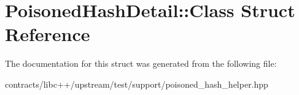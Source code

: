 \hypertarget{struct_poisoned_hash_detail_1_1_class}{}\section{Poisoned\+Hash\+Detail\+:\+:Class Struct Reference}
\label{struct_poisoned_hash_detail_1_1_class}


The documentation for this struct was generated from the following file\+:\begin{DoxyCompactItemize}
\item 
contracts/libc++/upstream/test/support/poisoned\+\_\+hash\+\_\+helper.\+hpp\end{DoxyCompactItemize}
